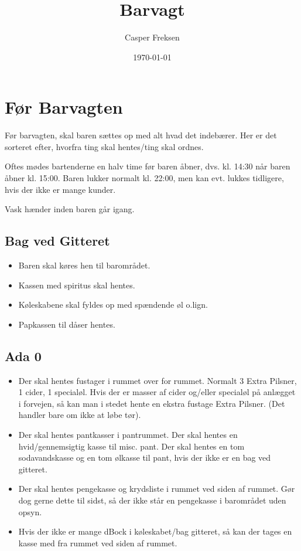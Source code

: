 

\title{Barvagt}
\date{\today}
\author{Casper Freksen}



\maketitle

\section{Før Barvagten}
\label{sec:pre-barvagten}

Før barvagten, skal baren sættes op med alt hvad det indebærer. Her er
det sorteret efter, hvorfra ting skal hentes/ting skal ordnes.

Oftes mødes bartenderne en halv time før baren åbner, dvs. kl. 14:30
når baren åbner kl. 15:00. Baren lukker normalt kl. 22:00, men kan
evt. lukkes tidligere, hvis der ikke er mange kunder.

Vask hænder inden baren går igang.

\subsection{Bag ved Gitteret}
\label{sec:pre:bag-ved-gitteret}

\begin{itemize}
\item Baren skal køres hen til barområdet.
\item Kassen med spiritus skal hentes.
\item Køleskabene skal fyldes op med spændende øl
  o.lign. 
\item Papkassen til dåser hentes.
\end{itemize}

\subsection{Ada 0}
\label{sec:pre:ada}

\begin{itemize}
\item Der skal hentes fustager i rummet over for rummet. Normalt 3
  Extra Pilsner, 1 cider, 1 specialøl. Hvis der er masser af cider
  og/eller specialøl på anlægget i forvejen, så kan man i stedet hente
  en ekstra fustage Extra Pilsner. (Det handler bare om ikke at løbe
  tør).
\item Der skal hentes pantkasser i pantrummet. Der skal hentes en
  hvid/gennemsigtig kasse til misc. pant. Der skal hentes en tom
  sodavandskasse og en tom ølkasse til pant, hvis der ikke er en bag
  ved gitteret.
\item Der skal hentes pengekasse og krydsliste i rummet ved siden af
  rummet. Gør dog gerne dette til sidst, så der ikke står en
  pengekasse i barområdet uden opsyn.
\item Hvis der ikke er mange dBock\texttrademark{} i køleskabet/bag gitteret, så kan
  der tages en kasse med fra rummet ved siden af rummet.
\end{itemize}


